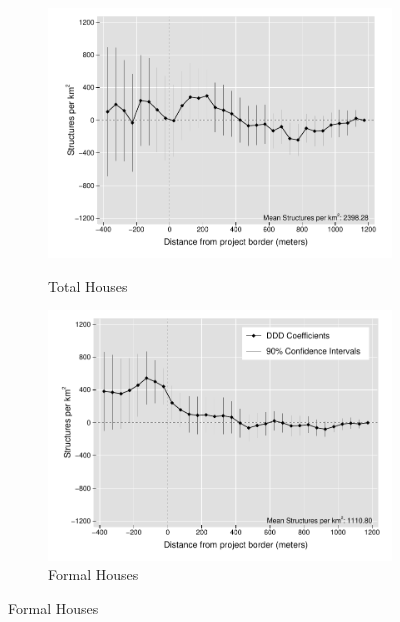 \documentclass[12pt]{article}
\begin{document}
\begin{figure}[t!]
    \centering
    \vspace{2mm}
    \begin{subfigure}[b]{0.49\textwidth}
        \centering
        \caption[]{\small Total Houses}  
        \vspace{-1mm}
        \includegraphics[width=\textwidth,trim={.5cm .3cm .3cm 0cm}, clip=true]{figures/distplotDDD_bblu_total_buildings_admin}
        \label{fig:DDDtotal}
    \end{subfigure}
    \hfill
    \begin{subfigure}[b]{0.49\textwidth}  
        \centering 
        \caption[]{\small Formal Houses}
        \vspace{-1mm}
        \includegraphics[width=\textwidth,trim={.5cm .3cm .3cm 0cm}, clip=true]{figures/distplotDDD_bblu_for_admin}     

\end{subfigure}
\end{figure}
\end{document}
